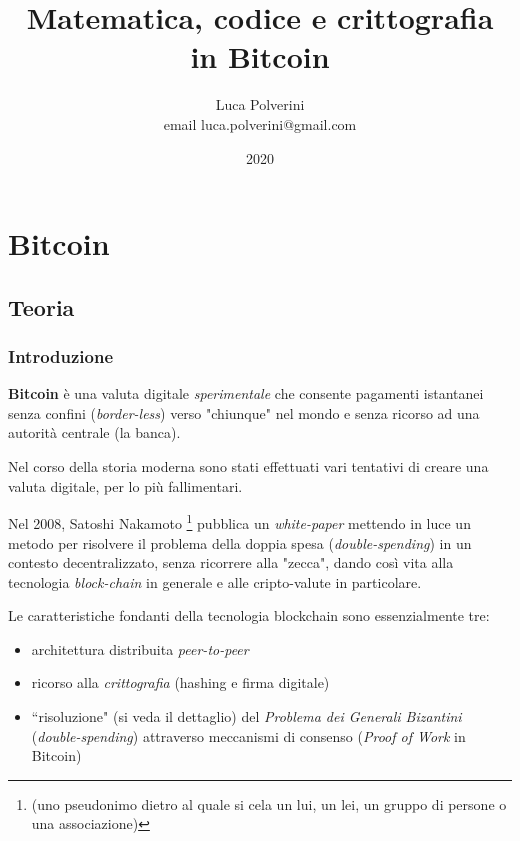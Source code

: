 \documentclass{book}
\title{Matematica, codice e crittografia in Bitcoin}
\author{Luca Polverini \\ email luca.polverini@gmail.com}
\date{2020}
\theoremstyle{definition}
\begin{document}
\maketitle


\newpage

\tableofcontents

\newpage
\part{Bitcoin}

\chapter{Teoria}
\section{Introduzione}

\textbf{Bitcoin} è una valuta digitale \textit{sperimentale} che consente pagamenti istantanei senza confini (\textit{border-less})
verso "chiunque" nel mondo e senza ricorso ad una autorità centrale (la banca).

Nel corso della storia moderna sono stati effettuati vari tentativi di creare una valuta digitale, per lo più fallimentari.

Nel 2008, Satoshi Nakamoto \footnote{(uno pseudonimo dietro al quale si cela un lui, un lei, un gruppo di persone o una associazione)} 
pubblica un \textit{white-paper}\cite{Nakamoto} mettendo in luce un metodo per risolvere il problema della doppia spesa (\textit{double-spending})
in un contesto decentralizzato, senza ricorrere alla "zecca", dando così vita alla tecnologia \textit{block-chain} in generale e alle cripto-valute in particolare.

Le caratteristiche fondanti della tecnologia blockchain sono essenzialmente tre:

\begin{itemize}
    \item architettura distribuita \textit{peer-to-peer}
    \item ricorso alla \textit{crittografia} (hashing e firma digitale)
    \item ``risoluzione" (si veda il dettaglio) del \textit{Problema dei Generali Bizantini} (\textit{double-spending}) attraverso meccanismi di consenso (\textit{Proof of Work} in Bitcoin)
\end{itemize}
\end{document}
